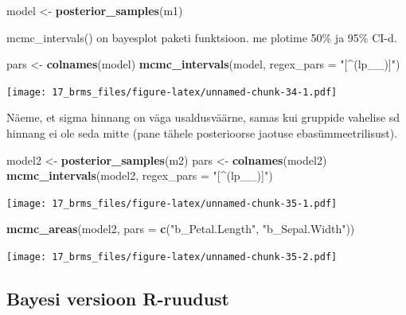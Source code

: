 \documentclass[]{book}
\newenvironment{Shaded}{\begin{snugshade}}{\end{snugshade}}
\newcommand{\KeywordTok}[1]{\textcolor[rgb]{0.13,0.29,0.53}{\textbf{#1}}}
\newcommand{\DataTypeTok}[1]{\textcolor[rgb]{0.13,0.29,0.53}{#1}}
\newcommand{\StringTok}[1]{\textcolor[rgb]{0.31,0.60,0.02}{#1}}
\newcommand{\NormalTok}[1]{#1}
\begin{document}
\begin{Shaded}
\begin{Highlighting}[]
\NormalTok{model <-}\StringTok{ }\KeywordTok{posterior_samples}\NormalTok{(m1)}
\end{Highlighting}
\end{Shaded}

mcmc\_intervals() on bayesplot paketi funktsioon. me plotime 50\% ja
95\% CI-d.

\begin{Shaded}
\begin{Highlighting}[]
\NormalTok{pars <-}\StringTok{ }\KeywordTok{colnames}\NormalTok{(model)}
\KeywordTok{mcmc_intervals}\NormalTok{(model, }\DataTypeTok{regex_pars =} \StringTok{"[^(lp__)]"}\NormalTok{)}
\end{Highlighting}
\end{Shaded}

\texttt{[image: 17\_brms\_files/figure-latex/unnamed-chunk-34-1.pdf]}

Näeme, et sigma hinnang on väga usaldusväärne, samas kui gruppide
vahelise sd hinnang ei ole seda mitte (pane tähele posterioorse jaotuse
ebasümmeetrilisust).

\begin{Shaded}
\begin{Highlighting}[]
\NormalTok{model2 <-}\StringTok{ }\KeywordTok{posterior_samples}\NormalTok{(m2)}
\NormalTok{pars <-}\StringTok{ }\KeywordTok{colnames}\NormalTok{(model2)}
\KeywordTok{mcmc_intervals}\NormalTok{(model2, }\DataTypeTok{regex_pars =} \StringTok{"[^(lp__)]"}\NormalTok{)}
\end{Highlighting}
\end{Shaded}

\texttt{[image: 17\_brms\_files/figure-latex/unnamed-chunk-35-1.pdf]}

\begin{Shaded}
\begin{Highlighting}[]
\KeywordTok{mcmc_areas}\NormalTok{(model2,  }\DataTypeTok{pars =} \KeywordTok{c}\NormalTok{(}\StringTok{"b_Petal.Length"}\NormalTok{, }\StringTok{"b_Sepal.Width"}\NormalTok{))}
\end{Highlighting}
\end{Shaded}

\texttt{[image: 17\_brms\_files/figure-latex/unnamed-chunk-35-2.pdf]}

\subsection{Bayesi versioon R-ruudust}\label{bayesi-versioon-r-ruudust}
\end{document}
